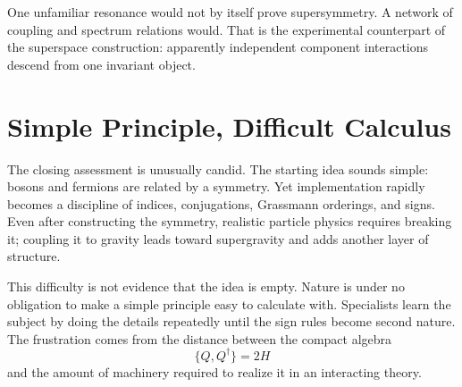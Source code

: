 \begin{classroomqa}
\end{classroomqa}

One unfamiliar resonance would not by itself prove supersymmetry. A network of coupling and spectrum relations would. That is the experimental counterpart of the superspace construction: apparently independent component interactions descend from one invariant object.

\begin{classroomqa}
\end{classroomqa}

\section{Simple Principle, Difficult Calculus}

The closing assessment is unusually candid. The starting idea sounds simple: bosons and fermions are related by a symmetry. Yet implementation rapidly becomes a discipline of indices, conjugations, Grassmann orderings, and signs. Even after constructing the symmetry, realistic particle physics requires breaking it; coupling it to gravity leads toward supergravity and adds another layer of structure.

This difficulty is not evidence that the idea is empty. Nature is under no obligation to make a simple principle easy to calculate with. Specialists learn the subject by doing the details repeatedly until the sign rules become second nature. The frustration comes from the distance between the compact algebra
\begin{equation}
\{Q,Q^\dagger\}=2H
\end{equation}
and the amount of machinery required to realize it in an interacting theory.


